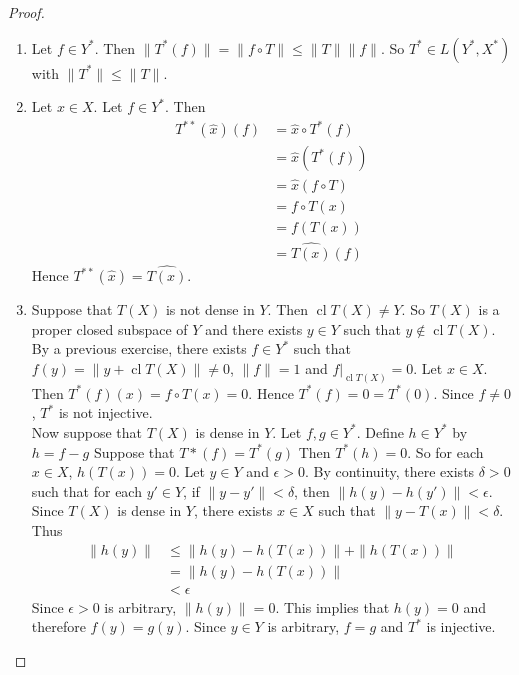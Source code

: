 \documentclass[12pt]{amsart}
\theoremstyle{definition}
\newcommand{\del}{\delta}
\newcommand{\ep}{\epsilon}
\DeclareMathOperator{\cl}{cl}
\DeclareMathOperator*{\0}{\mbf{0}}
\DeclareMathOperator*{\1}{\mbf{1}}
\begin{document}
	\begin{proof}\
		\begin{enumerate}
			\item Let $f \in Y^*$. Then $\|T^* (f) \|= \|f \circ T \|\leq  \|T \| \|f \|$. So $T^* \in L(Y^*, X^*)$ with $\|T^* \|\leq \|T \|$.\vspace{.5cm}\\
			\item Let $x \in X$. Let $f \in Y^*$. Then 
			\begin{align*}
				T^{**}(\hat{x})(f) 
				&= \hat{x} \circ T^{*}(f) \\
				&= \hat{x}(T^* (f)) \\
				&= \hat{x}(f \circ T) \\
				&= f \circ T (x) \\
				&= f(T(x)) \\
				&= \widehat{T(x)}(f)
			\end{align*} 
			Hence $T^{**}(\hat{x}) = \widehat{T(x)}$.\vspace{.5cm}\\
			\item Suppose that $T(X)$ is not dense in $Y$. Then $\cl T(X) \neq Y$. So $T(X)$ is a proper closed subspace of $Y$ and there exists $y \in Y$ such that $y \not \in \cl T(X)$. By a previous exercise, there exists $f \in Y^*$ such that $f(y) = \|y+\cl T(X) \|\neq 0$, $\|f \|=1$ and $f|_{\cl T(X)} = 0$. Let $x \in X$. Then $T^*(f)(x) = f \circ T(x) = 0$. Hence $T^*(f) = 0 = T^*(0)$. Since $f \neq 0$, $T^*$ is not injective.\\ Now suppose that $T(X)$ is dense in $Y$. Let $f,g \in Y^*$. Define $h \in Y^*$ by $h = f-g$ Suppose that $T*(f) = T^*(g)$ Then $T^*(h) = 0$. So for each $x \in X$, $h(T(x)) = 0$. Let $y \in Y$ and $\ep >0$. By continuity, there exists $\del > 0 $ such that for each $y' \in Y$, if $\|y - y' \|< \del$, then $\|h(y) - h(y') \|< \ep$. Since $T(X)$ is dense in $Y$, there exists $x \in X$ such that $\|y - T(x) \|< \del$. Thus 
			\begin{align*}
				\|h (y) \|
				&\leq \|h(y) - h(T(x)) \|+ \|h(T(x)) \|\\
				& = \|h(y) - h(T(x)) \| \\
				& < \ep
			\end{align*} 
			Since $\ep > 0$ is arbitrary, $\|h(y) \|= 0$. This implies that $h(y) = 0$ and therefore $f(y) = g(y) $. Since $y \in Y$ is arbitrary, $f=g$ and $T^*$ is injective. \vspace{.5cm}\\

\end{enumerate}
\end{proof}
\end{document}
